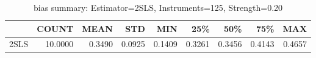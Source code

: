 \begin{table}[ht]
\centering
\caption{bias summary: Estimator=2SLS, Instruments=125, Strength=0.20}
\begin{tabular}{lrrrrrrrr}
\toprule
 & COUNT & MEAN & STD & MIN & 25\% & 50\% & 75\% & MAX \\
\midrule
2SLS & 10.0000 & 0.3490 & 0.0925 & 0.1409 & 0.3261 & 0.3456 & 0.4143 & 0.4657 \\
\bottomrule
\end{tabular}
\end{table}
